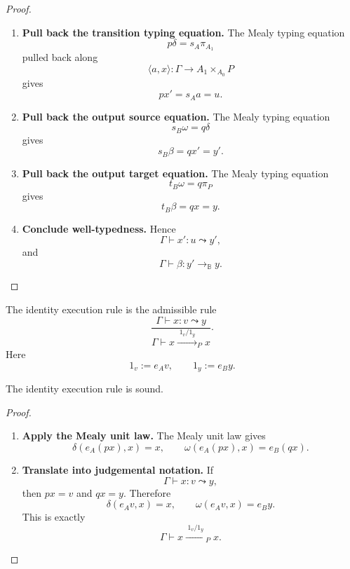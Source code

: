 \begin{proof}
    \leavevmode
    \begin{enumerate}
        \item \textbf{Pull back the transition typing equation.}
        The Mealy typing equation
        \[
            p\delta=s_A\pi_{A_1}
        \]
        pulled back along
        \[
            \langle a,x\rangle:\Gamma\to A_1\times_{A_0}P
        \]
        gives
        \[
            px'=s_Aa=u.
        \]

        \item \textbf{Pull back the output source equation.}
        The Mealy typing equation
        \[
            s_B\omega=q\delta
        \]
        gives
        \[
            s_B\beta=qx'=y'.
        \]

        \item \textbf{Pull back the output target equation.}
        The Mealy typing equation
        \[
            t_B\omega=q\pi_P
        \]
        gives
        \[
            t_B\beta=qx=y.
        \]

        \item \textbf{Conclude well-typedness.}
        Hence
        \[
            \Gamma\vdash x':u\leadsto y',
        \]
        and
        \[
            \Gamma\vdash \beta:y'\to_{\mathbb B}y.
        \]
    \end{enumerate}
\end{proof}

\begin{definition}
\label{def:identity-execution-rule}
    The identity execution rule is the admissible rule
    \[
        \frac{
            \Gamma\vdash x:v\leadsto y
        }
        {
            \Gamma\vdash
            x\xrightarrow{\;1_v/1_y\;}_{P}x
        }.
    \]
    Here
    \[
        1_v:=e_Av,
        \qquad
        1_y:=e_By.
    \]
\end{definition}

\begin{proposition}
\label{prop:soundness-identity-execution}
    The identity execution rule is sound.
\end{proposition}

\begin{proof}
    \leavevmode
    \begin{enumerate}
        \item \textbf{Apply the Mealy unit law.}
        The Mealy unit law gives
        \[
            \delta(e_A(px),x)=x,
            \qquad
            \omega(e_A(px),x)=e_B(qx).
        \]

        \item \textbf{Translate into judgemental notation.}
        If
        \[
            \Gamma\vdash x:v\leadsto y,
        \]
        then \(px=v\) and \(qx=y\). Therefore
        \[
            \delta(e_Av,x)=x,
            \qquad
            \omega(e_Av,x)=e_By.
        \]
        This is exactly
        \[
            \Gamma\vdash
            x\xrightarrow{\;1_v/1_y\;}_{P}x.
        \]
    \end{enumerate}
\end{proof}


